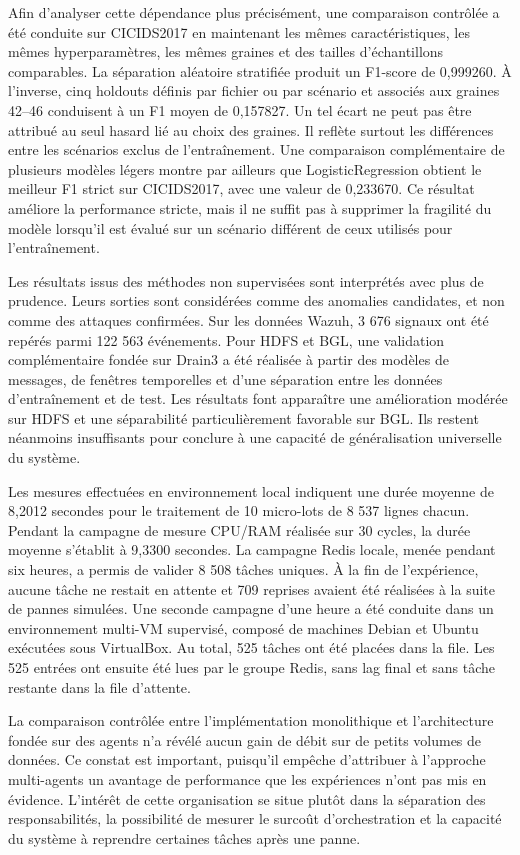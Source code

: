 \documentclass[12pt,a4paper,oneside]{report}
\begin{document}
Afin d'analyser cette dépendance plus précisément, une comparaison contrôlée a été conduite sur CICIDS2017 en maintenant les mêmes caractéristiques, les mêmes hyperparamètres, les mêmes graines et des tailles d'échantillons comparables. La séparation aléatoire stratifiée produit un F1-score de 0,999260. À l'inverse, cinq holdouts définis par fichier ou par scénario et associés aux graines 42--46 conduisent à un F1 moyen de 0,157827. Un tel écart ne peut pas être attribué au seul hasard lié au choix des graines. Il reflète surtout les différences entre les scénarios exclus de l'entraînement. Une comparaison complémentaire de plusieurs modèles légers montre par ailleurs que LogisticRegression obtient le meilleur F1 strict sur CICIDS2017, avec une valeur de 0,233670. Ce résultat améliore la performance stricte, mais il ne suffit pas à supprimer la fragilité du modèle lorsqu'il est évalué sur un scénario différent de ceux utilisés pour l'entraînement.

Les résultats issus des méthodes non supervisées sont interprétés avec plus de prudence. Leurs sorties sont considérées comme des anomalies candidates, et non comme des attaques confirmées. Sur les données Wazuh, 3 676 signaux ont été repérés parmi 122 563 événements. Pour HDFS et BGL, une validation complémentaire fondée sur Drain3 a été réalisée à partir des modèles de messages, de fenêtres temporelles et d'une séparation entre les données d'entraînement et de test. Les résultats font apparaître une amélioration modérée sur HDFS et une séparabilité particulièrement favorable sur BGL. Ils restent néanmoins insuffisants pour conclure à une capacité de généralisation universelle du système.

Les mesures effectuées en environnement local indiquent une durée moyenne de 8,2012 secondes pour le traitement de 10 micro-lots de 8 537 lignes chacun. Pendant la campagne de mesure CPU/RAM réalisée sur 30 cycles, la durée moyenne s'établit à 9,3300 secondes. La campagne Redis locale, menée pendant six heures, a permis de valider 8 508 tâches uniques. À la fin de l'expérience, aucune tâche ne restait en attente et 709 reprises avaient été réalisées à la suite de pannes simulées. Une seconde campagne d'une heure a été conduite dans un environnement multi-VM supervisé, composé de machines Debian et Ubuntu exécutées sous VirtualBox. Au total, 525 tâches ont été placées dans la file. Les 525 entrées ont ensuite été lues par le groupe Redis, sans lag final et sans tâche restante dans la file d'attente.

La comparaison contrôlée entre l'implémentation monolithique et l'architecture fondée sur des agents n'a révélé aucun gain de débit sur de petits volumes de données. Ce constat est important, puisqu'il empêche d'attribuer à l'approche multi-agents un avantage de performance que les expériences n'ont pas mis en évidence. L'intérêt de cette organisation se situe plutôt dans la séparation des responsabilités, la possibilité de mesurer le surcoût d'orchestration et la capacité du système à reprendre certaines tâches après une panne.
\end{document}
